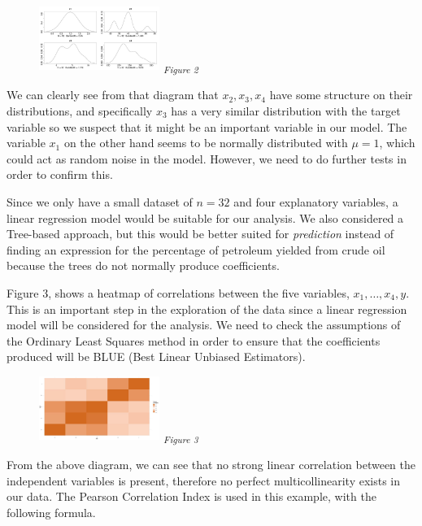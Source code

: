 \documentclass[fleqn, a4paper]{report}
\begin{document}
\begin{figure}[!h]
\includegraphics[width=0.35\textwidth]{./images/KDEs.jpg}
\textsubscript{\textit{Figure 2}}
\label{tab:fig_1}
\end{figure}

We can clearly see from that diagram that $x_2,x_3,x_4$ have some structure on their distributions, and specifically $x_3$ has a very similar distribution with the target variable so we suspect that it might be an important variable in our model. The variable $x_1$ on the other hand seems to be normally distributed with $\mu = 1$, which could act as random noise in the model. However, we need to do further tests in order to confirm this. 

Since we only have a small dataset of $n=32$ and four explanatory variables, a linear regression model would be suitable for our analysis. We also considered a Tree-based approach, but this would be better suited for \textit{prediction} instead of finding an expression for the percentage of petroleum yielded from crude oil because the trees do not normally produce coefficients.

Figure 3, shows a heatmap of correlations between the five variables, $x_1,\dots,x_4,y$. This is an important step in the exploration of the data since a linear regression model will be considered for the analysis. We need to check the assumptions of the Ordinary Least Squares method in order to ensure that the coefficients produced will be BLUE (Best Linear Unbiased Estimators). 

\begin{figure}[!h]
\includegraphics[width=0.35\textwidth]{./images/heatmap.jpg}
\textsubscript{\textit{Figure 3}}
\label{tab:fig_1}
\end{figure}

From the above diagram, we can see that no strong linear correlation between the independent variables is present, therefore no perfect multicollinearity exists in our data. The Pearson Correlation Index is used in this example, with the following formula.
\end{document}
